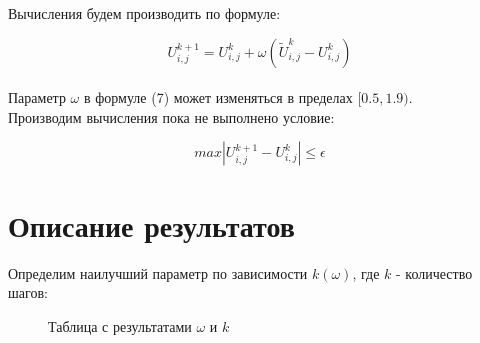\documentclass[a4paper,fontsize=14pt]{article}
\begin{document}
	Вычисления будем производить по формуле:
	
	\begin{equation}
		U_{i,j}^{k+1} = U_{i,j}^{k} + \omega(\tilde{U}_{i,j}^k - U_{i,j}^k)
	\end{equation} \\
	
	Параметр $\omega$ в формуле (7) может изменяться в пределах $[0.5,1.9)$.\\ 
	
	Производим вычисления пока не выполнено условие:
	
	$$max|U_{i,j}^{k+1} - U_{i,j}^k| \leq \epsilon$$
	
	\section{Описание результатов}
	
	Определим наилучший параметр по зависимости $k(\omega)$, где $k$ - количество шагов:
	
	\begin{figure}[h]
		\label{pic1}
		\caption{}
	\end{figure}
	
	\newpage
	
	\begin{figure}[h]
		\label{pic1}
		\caption{Таблица с результатами $\omega$ и $k$}
	\end{figure}
	
\end{document}
